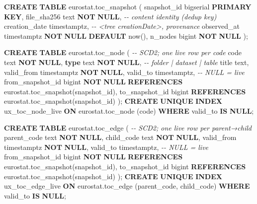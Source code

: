 \documentclass[
]{article}
\newenvironment{Shaded}{\begin{snugshade}}{\end{snugshade}}
\newcommand{\CommentTok}[1]{\textcolor[rgb]{0.56,0.35,0.01}{\textit{#1}}}
\newcommand{\KeywordTok}[1]{\textcolor[rgb]{0.13,0.29,0.53}{\textbf{#1}}}
\newcommand{\NormalTok}[1]{#1}
\begin{document}
\begin{Shaded}
\begin{Highlighting}[]
\KeywordTok{CREATE} \KeywordTok{TABLE}\NormalTok{ eurostat.toc\_snapshot (}
\NormalTok{  snapshot\_id   bigserial }\KeywordTok{PRIMARY} \KeywordTok{KEY}\NormalTok{,}
\NormalTok{  file\_sha256   text }\KeywordTok{NOT} \KeywordTok{NULL}\NormalTok{,          }\CommentTok{{-}{-} content identity (dedup key)}
\NormalTok{  creation\_date timestamptz,            }\CommentTok{{-}{-} \textless{}tree creationDate\textgreater{}, provenance}
\NormalTok{  observed\_at   timestamptz }\KeywordTok{NOT} \KeywordTok{NULL} \KeywordTok{DEFAULT}\NormalTok{ now(),}
\NormalTok{  n\_nodes       bigint }\KeywordTok{NOT} \KeywordTok{NULL}
\NormalTok{);}

\KeywordTok{CREATE} \KeywordTok{TABLE}\NormalTok{ eurostat.toc\_node (        }\CommentTok{{-}{-} SCD2; one live row per code}
\NormalTok{  code  text }\KeywordTok{NOT} \KeywordTok{NULL}\NormalTok{,}
  \KeywordTok{type}\NormalTok{  text }\KeywordTok{NOT} \KeywordTok{NULL}\NormalTok{,                  }\CommentTok{{-}{-} \textquotesingle{}folder\textquotesingle{} | \textquotesingle{}dataset\textquotesingle{} | \textquotesingle{}table\textquotesingle{}}
\NormalTok{  title text,}
\NormalTok{  valid\_from timestamptz }\KeywordTok{NOT} \KeywordTok{NULL}\NormalTok{,}
\NormalTok{  valid\_to   timestamptz,               }\CommentTok{{-}{-} NULL = live}
\NormalTok{  from\_snapshot\_id bigint }\KeywordTok{NOT} \KeywordTok{NULL} \KeywordTok{REFERENCES}\NormalTok{ eurostat.toc\_snapshot(snapshot\_id),}
\NormalTok{  to\_snapshot\_id   bigint          }\KeywordTok{REFERENCES}\NormalTok{ eurostat.toc\_snapshot(snapshot\_id)}
\NormalTok{);}
\KeywordTok{CREATE} \KeywordTok{UNIQUE} \KeywordTok{INDEX}\NormalTok{ ux\_toc\_node\_live }\KeywordTok{ON}\NormalTok{ eurostat.toc\_node (code) }\KeywordTok{WHERE}\NormalTok{ valid\_to }\KeywordTok{IS} \KeywordTok{NULL}\NormalTok{;}

\KeywordTok{CREATE} \KeywordTok{TABLE}\NormalTok{ eurostat.toc\_edge (        }\CommentTok{{-}{-} SCD2; one live row per parent→child}
\NormalTok{  parent\_code text }\KeywordTok{NOT} \KeywordTok{NULL}\NormalTok{,}
\NormalTok{  child\_code  text }\KeywordTok{NOT} \KeywordTok{NULL}\NormalTok{,}
\NormalTok{  valid\_from timestamptz }\KeywordTok{NOT} \KeywordTok{NULL}\NormalTok{,}
\NormalTok{  valid\_to   timestamptz,               }\CommentTok{{-}{-} NULL = live}
\NormalTok{  from\_snapshot\_id bigint }\KeywordTok{NOT} \KeywordTok{NULL} \KeywordTok{REFERENCES}\NormalTok{ eurostat.toc\_snapshot(snapshot\_id),}
\NormalTok{  to\_snapshot\_id   bigint          }\KeywordTok{REFERENCES}\NormalTok{ eurostat.toc\_snapshot(snapshot\_id)}
\NormalTok{);}
\KeywordTok{CREATE} \KeywordTok{UNIQUE} \KeywordTok{INDEX}\NormalTok{ ux\_toc\_edge\_live }\KeywordTok{ON}\NormalTok{ eurostat.toc\_edge (parent\_code, child\_code) }
  \KeywordTok{WHERE}\NormalTok{ valid\_to }\KeywordTok{IS} \KeywordTok{NULL}\NormalTok{;}
\end{Highlighting}
\end{Shaded}
\end{document}

